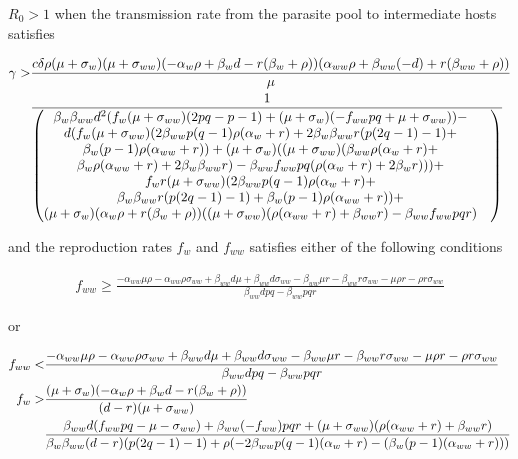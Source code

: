 \documentclass[11pt]{article}
\begin{document}
$R_0 > 1$ when the transmission rate from the parasite pool to intermediate hosts satisfies

\begin{align}
	\gamma > & \frac{c \delta  \rho  (\mu + \sigma_w) (\mu + \sigma_{ww}) (-\alpha_w \rho + \beta_w d-r (\beta_w+\rho )) (\alpha_{ww} \rho + \beta_{ww} (-d)+r (\beta_{ww}+\rho ))}{\mu } \notag \\
	& \frac{1}{\begin{pmatrix}
		\beta_w \beta_{ww} d^2 (f_w (\mu +\sigma_{ww}) (2 p q-p-1) + (\mu +\sigma_w) (-f_{ww} p q+\mu +\sigma_{ww})) - & \\
		 d (f_w (\mu +\sigma_{ww}) (2 \beta_{ww} p (q-1) \rho  (\alpha_w+r)+2 \beta_w \beta_{ww} r (p (2 q-1)-1)+ & \\
		 \beta_w (p-1) \rho  (\alpha_{ww}+r)) + (\mu +\sigma_w) ((\mu +\sigma_{ww}) (\beta_{ww} \rho  (\alpha_w+r) + & \\ 
		 \beta_w \rho  (\alpha_{ww}+r)+2 \beta_w \beta_{ww} r)-\beta_{ww} f_{ww} p q (\rho  (\alpha_w+r)+2 \beta_w r))) + & \\
		 f_w r (\mu +\sigma_{ww}) (2 \beta_{ww} p (q-1) \rho  (\alpha_w+r) +  & \\
		 \beta_w \beta_{ww} r (p (2 q-1)-1) + \beta_w (p-1) \rho  (\alpha_{ww}+r)) + & \\
		 (\mu +\sigma_w) (\alpha_w \rho +r (\beta_w+\rho )) ((\mu +\sigma_{ww}) (\rho  (\alpha_{ww}+r)+\beta_{ww} r)-\beta_{ww} f_{ww} p q r)
		\end{pmatrix}}
\end{align}

and the reproduction rates $f_w$ and $f_{ww}$ satisfies either of the following conditions

\begin{align}
f_{ww}\geq \frac{-\alpha_{ww} \mu  \rho -\alpha_{ww} \rho  \sigma_{ww} + \beta_{ww} d \mu +\beta_{ww} d \sigma_{ww}-\beta_{ww} \mu  r-\beta_{ww} r \sigma_{ww}-\mu  \rho  r-\rho  r \sigma_{ww}}{\beta_{ww} d p q-\beta_{ww} p q r}
\end{align}

or

\begin{align}
	f_{ww} < & \frac{-\alpha_{ww} \mu  \rho -\alpha_{ww} \rho  \sigma_{ww} + \beta_{ww} d \mu +\beta_{ww} d \sigma_{ww}-\beta_{ww} \mu  r-\beta_{ww} r \sigma_{ww}-\mu  \rho  r-\rho  r \sigma_{ww}}{\beta_{ww} d p q-\beta_{ww} p q r} \notag \\
	f_w > & \frac{(\mu +\sigma_w) (-\alpha_w \rho + \beta_w d-r (\beta_w+\rho ))}{(d-r) (\mu + \sigma_{ww})} \notag \\
	& \frac{\beta_{ww} d (f_{ww} p q-\mu -\sigma_{ww})+\beta_{ww} (-f_{ww}) p q r+(\mu +\sigma_{ww}) (\rho  (\alpha_{ww}+r)+\beta_{ww} r)}{\beta_w \beta_{ww} (d-r) (p (2 q-1)-1)+\rho  (-2 \beta_{ww} p (q-1) (\alpha_w+r)-(\beta_w (p-1) (\alpha_{ww}+r)))} 
\end{align}
\end{document}
